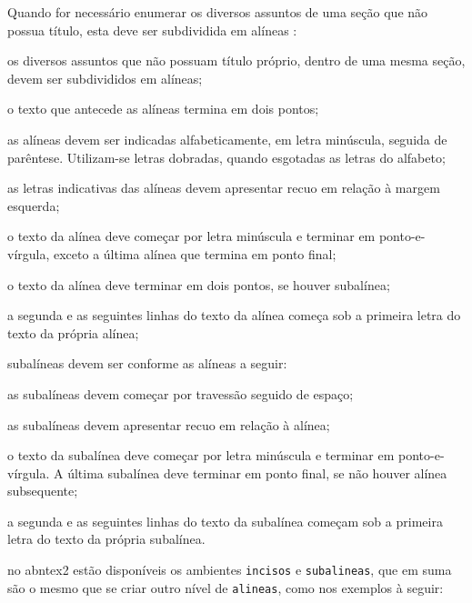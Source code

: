 Quando for necessário enumerar os diversos assuntos de uma seção que não possua título, esta deve ser subdividida em alíneas \cite[subseção 4.2]{NBR6024:2012}:

\begin{alineas}%
    \item os diversos assuntos que não possuam título próprio, dentro de uma mesma seção, devem ser subdivididos em alíneas;
    \item o texto que antecede as alíneas termina em dois pontos;
    \item as alíneas devem ser indicadas alfabeticamente, em letra minúscula, seguida de parêntese. Utilizam-se letras dobradas, quando esgotadas as letras do alfabeto;
    \item as letras indicativas das alíneas devem apresentar recuo em relação à margem esquerda;
    \item o texto da alínea deve começar por letra minúscula e terminar em ponto-e-vírgula, exceto a última alínea que termina em ponto final;
    \item o texto da alínea deve terminar em dois pontos, se houver subalínea;
    \item a segunda e as seguintes linhas do texto da alínea começa sob a primeira letra do texto da própria alínea;
    \item subalíneas \cite[subseção 4.3]{NBR6024:2012} devem ser conforme as alíneas a seguir:
    \begin{alineas}%
        \item as subalíneas devem começar por travessão seguido de espaço;
        \item as subalíneas devem apresentar recuo em relação à alínea;
        \item o texto da subalínea deve começar por letra minúscula e terminar em ponto-e-vírgula. A última subalínea deve terminar em ponto final, se não houver alínea subsequente;
        \item a segunda e as seguintes linhas do texto da subalínea começam sob a primeira letra do texto da própria subalínea.
    \end{alineas}
    \item no \gls{abntex2} estão disponíveis os ambientes \texttt{incisos} e \texttt{subalineas}, que em suma são o mesmo que se criar outro nível de \texttt{alineas}, como nos exemplos à seguir:

\end{alineas}
